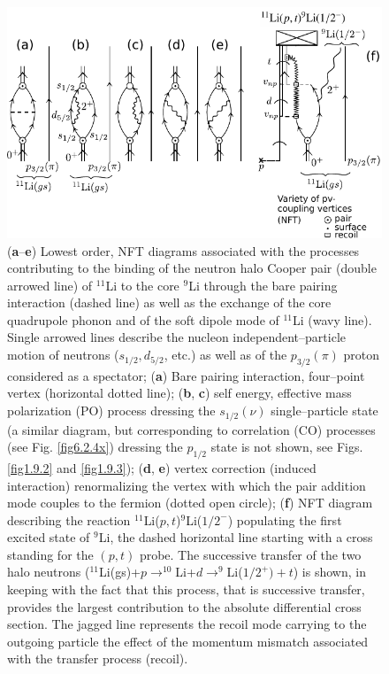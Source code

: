           \begin{figure}
          \centerline {
          \includegraphics*[width=12cm]{introduccion/figs/figintro5xx}
          }
          \caption{(\textbf{a}--\textbf{e}) Lowest order, NFT diagrams associated with the processes contributing  to the binding of the neutron halo Cooper pair (double arrowed line) of $^{11}$Li to the core $^9$Li through the bare pairing interaction (dashed line) as well as the  exchange of the core quadrupole phonon and of the soft dipole mode of $^{11}$Li (wavy line). Single arrowed lines describe the nucleon independent--particle motion of neutrons ($s_{1/2},d_{5/2}$, etc.) as well as of the $p_{3/2}(\pi)$ proton considered as a spectator;  (\textbf{a}) Bare pairing interaction, four--point vertex (horizontal dotted line); (\textbf{b}, \textbf{c}) self energy, effective mass polarization (PO) process dressing the $s_{1/2}(\nu)$ single--particle state (a similar diagram, but corresponding to correlation (CO) processes (see Fig. \ref{fig6.2.4x}) dressing the $p_{1/2}$ state is not shown, see Figs. \ref{fig1.9.2} and \ref{fig1.9.3}); (\textbf{d}, \textbf{e}) vertex correction (induced interaction) renormalizing the  vertex with which the pair addition mode couples to the fermion (dotted open circle); (\textbf{f}) NFT diagram describing the reaction $^{11}$Li($p,t$)$^9$Li($1/2^-$) populating the first excited state of $^9$Li, the dashed horizontal line starting with a cross standing for the $(p,t)$ probe. The successive transfer of the two halo neutrons ($^{11}$Li(gs)+$p\rightarrow^{10}$Li+$d\rightarrow^9$Li($1/2^+)+t$) is shown, in keeping with the fact that this process, that is successive transfer, provides the largest contribution to the absolute differential cross section. The jagged line represents the recoil mode carrying  to the outgoing particle the effect of the momentum mismatch associated with the transfer process (recoil).}
          \label{figintro5}
          \end{figure}
